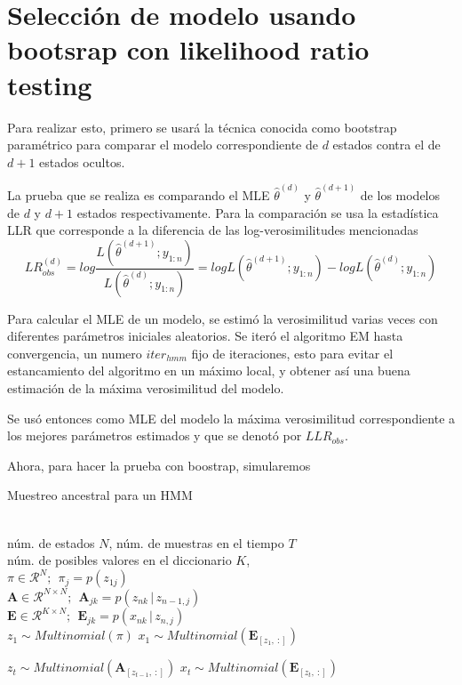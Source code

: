 \section{Selección de modelo usando bootsrap con likelihood ratio testing}

Para realizar esto, primero se usará la técnica conocida como bootstrap paramétrico para comparar el modelo correspondiente de $d$ estados contra el de $d+1$ estados ocultos.

La prueba que se realiza es comparando el \ac{MLE} $\hat \theta^{(d)}$ y $\hat \theta^{(d+1)}$ de los modelos de $d$ y $d+1$ estados respectivamente. Para la comparación se usa la estadística \ac{LLR} que corresponde a la diferencia de las log-verosimilitudes mencionadas
\begin{equation}
  LR^{(d)}_{obs} = log \frac{L(\hat \theta^{(d+1)}; y_{1:n})}{L(\hat \theta^{(d)}; y_{1:n})} =
    log L(\hat \theta^{(d+1)}; y_{1:n}) - 
    log L(\hat \theta^{(d)}; y_{1:n})
\end{equation}

Para calcular el \ac{MLE} de un modelo, se estimó la verosimilitud varias veces con diferentes parámetros iniciales aleatorios. Se iteró el algoritmo \ac{EM} hasta convergencia, un numero $iter_{hmm}$ fijo de iteraciones, esto para evitar el estancamiento del algoritmo en un máximo local, y obtener así una buena estimación de la máxima verosimilitud del modelo.

Se usó entonces como \ac{MLE} del modelo la máxima verosimilitud correspondiente a los mejores parámetros estimados y que se denotó por $LLR_{obs}$.

Ahora, para hacer la prueba con boostrap, simularemos 

\begin{algorithm}[tp]
   \caption{Muestreo ancestral para un HMM}
   \label{alg:ancsamp}
\begin{algorithmic}
    \\
   núm. de estados $N$, núm. de muestras en el tiempo $T$ \\
   núm. de posibles valores en el diccionario $K$, \\
   $ \pi \in \mathcal{R}^{N}; ~~ \pi_j = p(z_{1j})$ \\
   $ \mathbf{A} \in \mathcal{R}^{N \times N}; ~~
   \mathbf{A}_{jk} = p(z_{nk} \,|\, z_{n-1, j})$ \\

   $ \mathbf{E} \in \mathcal{R}^{K \times N}; ~~
   \mathbf{E}_{jk} = p(x_{nk} \,|\, z_{n, j})$\\  
   \STATE
   \STATE $z_1 \sim Multinomial(\pi)$   
   \STATE $x_1 \sim Multinomial(\mathbf{E}_{[z_1,~:]})$

    \STATE $z_t \sim Multinomial(\mathbf{A}_{[z_{t-1},~:]})$ 
    \STATE $x_t \sim Multinomial(\mathbf{E}_{[z_t,~:]})$
   \ENDFOR   
\end{algorithmic}
\end{algorithm}

